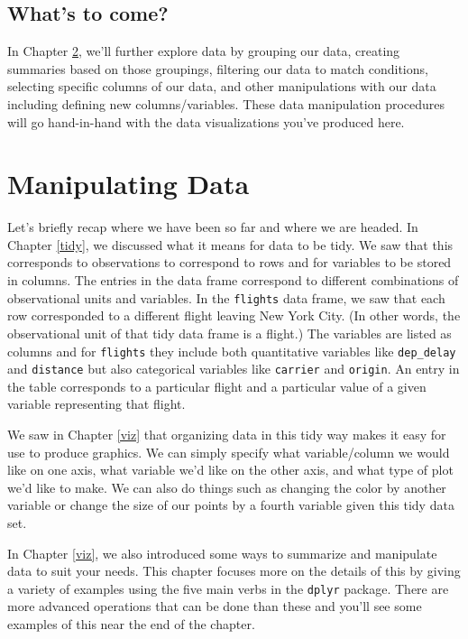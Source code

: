 \documentclass[]{tufte-book}
\begin{document}
\section{What's to come?}\label{whats-to-come-1}

In Chapter \ref{manip}, we'll further explore data by grouping our data,
creating summaries based on those groupings, filtering our data to match
conditions, selecting specific columns of our data, and other
manipulations with our data including defining new columns/variables.
These data manipulation procedures will go hand-in-hand with the data
visualizations you've produced here.

\chapter{Manipulating Data}\label{manip}

Let's briefly recap where we have been so far and where we are headed.
In Chapter \ref{tidy}, we discussed what it means for data to be tidy.
We saw that this corresponds to observations to correspond to rows and
for variables to be stored in columns. The entries in the data frame
correspond to different combinations of observational units and
variables. In the \texttt{flights} data frame, we saw that each row
corresponded to a different flight leaving New York City. (In other
words, the observational unit of that tidy data frame is a flight.) The
variables are listed as columns and for \texttt{flights} they include
both quantitative variables like \texttt{dep\_delay} and
\texttt{distance} but also categorical variables like \texttt{carrier}
and \texttt{origin}. An entry in the table corresponds to a particular
flight and a particular value of a given variable representing that
flight.

We saw in Chapter \ref{viz} that organizing data in this tidy way makes
it easy for use to produce graphics. We can simply specify what
variable/column we would like on one axis, what variable we'd like on
the other axis, and what type of plot we'd like to make. We can also do
things such as changing the color by another variable or change the size
of our points by a fourth variable given this tidy data set.

In Chapter \ref{viz}, we also introduced some ways to summarize and
manipulate data to suit your needs. This chapter focuses more on the
details of this by giving a variety of examples using the five main
verbs in the \texttt{dplyr} package. There are more advanced operations
that can be done than these and you'll see some examples of this near
the end of the chapter.
\end{document}
